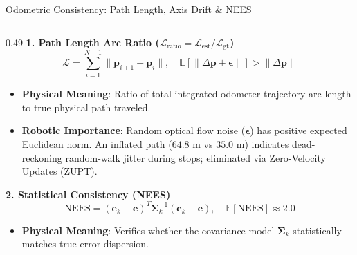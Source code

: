 \documentclass[aspectratio=169, 10pt]{beamer}
\begin{document}
\begin{frame}{Odometric Consistency: Path Length, Axis Drift \& NEES}
  \begin{columns}[T]
    \begin{column}{0.49\textwidth}
      {\small \textbf{\textcolor{NavyBlue}{1. Path Length Arc Ratio ($\mathcal{L}_{\text{ratio}} = \mathcal{L}_{\text{est}} / \mathcal{L}_{\text{gt}}$)}}}
      \begin{equation}
        \mathcal{L} = \sum_{i=1}^{N-1} \|\mathbf{p}_{i+1} - \mathbf{p}_i\|, \quad \mathbb{E}[\|\Delta \mathbf{p} + \boldsymbol{\epsilon}\|] > \|\Delta \mathbf{p}\|
      \end{equation}
      \scriptsize
      \begin{itemize}
        \setlength{\itemsep}{1.5pt}
        \item \textbf{Physical Meaning}: Ratio of total integrated odometer trajectory arc length to true physical path traveled.
        \item \textbf{Robotic Importance}: Random optical flow noise ($\boldsymbol{\epsilon}$) has positive expected Euclidean norm. An inflated path ($64.8\text{ m}$ vs $35.0\text{ m}$) indicates dead-reckoning random-walk jitter during stops; eliminated via Zero-Velocity Updates (ZUPT).
      \end{itemize}

      \vspace{0.1cm}
      {\small \textbf{\textcolor{NavyBlue}{2. Statistical Consistency (NEES)}}}
      \begin{equation}
        \text{NEES} = (\mathbf{e}_k - \bar{\mathbf{e}})^T \mathbf{\Sigma}_k^{-1} (\mathbf{e}_k - \bar{\mathbf{e}}), \quad \mathbb{E}[\text{NEES}] \approx 2.0
      \end{equation}
      \scriptsize
      \begin{itemize}
        \setlength{\itemsep}{1.5pt}
        \item \textbf{Physical Meaning}: Verifies whether the covariance model $\mathbf{\Sigma}_k$ statistically matches true error dispersion.
      \end{itemize}
    \end{column}


\end{columns}
\end{frame}
\end{document}
